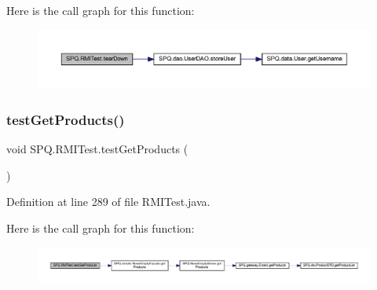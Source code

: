Here is the call graph for this function\+:\nopagebreak
\begin{figure}[H]
\begin{center}
\leavevmode
\includegraphics[width=350pt]{class_s_p_q_1_1_r_m_i_test_a76a8f88205d4a70c8ed81ee03ab7fa45_cgraph}
\end{center}
\end{figure}
\mbox{\label{class_s_p_q_1_1_r_m_i_test_afd1616ccf97ef054e05f3ca90d22753e}} 
\subsubsection{\texorpdfstring{test\+Get\+Products()}{testGetProducts()}}
{\footnotesize\ttfamily void S\+P\+Q.\+R\+M\+I\+Test.\+test\+Get\+Products (\begin{DoxyParamCaption}{ }\end{DoxyParamCaption})}



Definition at line 289 of file R\+M\+I\+Test.\+java.

Here is the call graph for this function\+:\nopagebreak
\begin{figure}[H]
\begin{center}
\leavevmode
\includegraphics[width=350pt]{class_s_p_q_1_1_r_m_i_test_afd1616ccf97ef054e05f3ca90d22753e_cgraph}
\end{center}
\end{figure}
\mbox{\label{class_s_p_q_1_1_r_m_i_test_a15a72e3572c99f10ba0ac5b0368f1a02}} 
